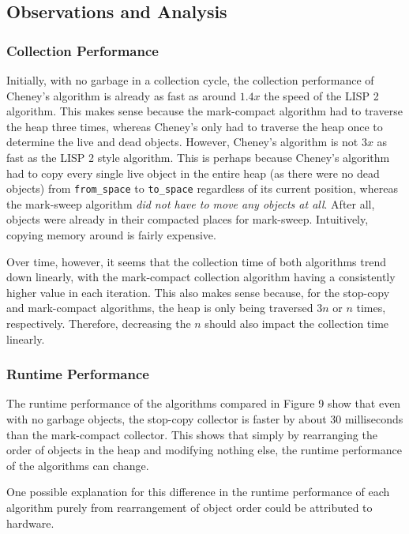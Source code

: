 \documentclass[index]{subfiles}
\begin{document}
\subsection{Observations and Analysis}

\subsubsection{Collection Performance}

Initially, with no garbage in a collection cycle, the collection performance of Cheney's algorithm is already as fast as around \(1.4x\) the speed of the LISP 2 algorithm. This makes sense because the mark-compact algorithm had to traverse the heap three times, whereas Cheney's only had to traverse the heap once to determine the live and dead objects. However, Cheney's algorithm is not \(3x\) as fast as the LISP 2 style algorithm. This is perhaps because Cheney's algorithm had to copy every single live object in the entire heap (as there were no dead objects) from \verb+from_space+ to \verb+to_space+ regardless of its current position, whereas the mark-sweep algorithm \textit{did not have to move any objects at all}. After all, objects were already in their compacted places for mark-sweep. Intuitively, copying memory around is fairly expensive.

Over time, however, it seems that the collection time of both algorithms trend down linearly, with the mark-compact collection algorithm having a consistently higher value in each iteration. This also makes sense because, for the stop-copy and mark-compact algorithms, the heap is only being traversed \(3n\) or \(n\) times, respectively. Therefore, decreasing the \(n\) should also impact the collection time linearly.

\subsubsection{Runtime Performance}

The runtime performance of the algorithms compared in Figure 9 show that even with no garbage objects, the stop-copy collector is faster by about 30 milliseconds than the mark-compact collector. This shows that simply by rearranging the order of objects in the heap and modifying nothing else, the runtime performance of the algorithms can change.

One possible explanation for this difference in the runtime performance of each algorithm purely from rearrangement of object order could be attributed to hardware. 
\end{document}
